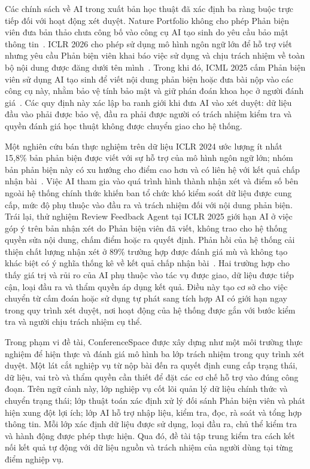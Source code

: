 Các chính sách về AI trong xuất bản học thuật đã xác định ba ràng buộc trực tiếp đối với hoạt động xét duyệt. Nature Portfolio không cho phép Phản biện viên đưa bản thảo chưa công bố vào công cụ AI tạo sinh do yêu cầu bảo mật thông tin~\cite{ch2ref41}. ICLR 2026 cho phép sử dụng mô hình ngôn ngữ lớn để hỗ trợ viết nhưng yêu cầu Phản biện viên khai báo việc sử dụng và chịu trách nhiệm về toàn bộ nội dung được đăng dưới tên mình~\cite{ch2ref15}. Trong khi đó, ICML 2025 cấm Phản biện viên sử dụng AI tạo sinh để viết nội dung phản biện hoặc đưa bài nộp vào các công cụ này, nhằm bảo vệ tính bảo mật và giữ phán đoán khoa học ở người đánh giá~\cite{ch2ref16}. Các quy định này xác lập ba ranh giới khi đưa AI vào xét duyệt: dữ liệu đầu vào phải được bảo vệ, đầu ra phải được người có trách nhiệm kiểm tra và quyền đánh giá học thuật không được chuyển giao cho hệ thống.

Một nghiên cứu bán thực nghiệm trên dữ liệu ICLR 2024 ước lượng ít nhất 15,8\% bản phản biện được viết với sự hỗ trợ của mô hình ngôn ngữ lớn; nhóm bản phản biện này có xu hướng cho điểm cao hơn và có liên hệ với kết quả chấp nhận bài~\cite{ch1ref14}. Việc AI tham gia vào quá trình hình thành nhận xét và điểm số bên ngoài hệ thống chính thức khiến ban tổ chức khó kiểm soát dữ liệu được cung cấp, mức độ phụ thuộc vào đầu ra và trách nhiệm đối với nội dung phản biện. Trái lại, thử nghiệm Review Feedback Agent tại ICLR 2025 giới hạn AI ở việc góp ý trên bản nhận xét do Phản biện viên đã viết, không trao cho hệ thống quyền sửa nội dung, chấm điểm hoặc ra quyết định. Phản hồi của hệ thống cải thiện chất lượng nhận xét ở 89\% trường hợp được đánh giá mù và không tạo khác biệt có ý nghĩa thống kê về kết quả chấp nhận bài~\cite{ch1ref3}. Hai trường hợp cho thấy giá trị và rủi ro của AI phụ thuộc vào tác vụ được giao, dữ liệu được tiếp cận, loại đầu ra và thẩm quyền áp dụng kết quả. Điều này tạo cơ sở cho việc chuyển từ cấm đoán hoặc sử dụng tự phát sang tích hợp AI có giới hạn ngay trong quy trình xét duyệt, nơi hoạt động của hệ thống được gắn với bước kiểm tra và người chịu trách nhiệm cụ thể.

Trong phạm vi đề tài, ConferenceSpace được xây dựng như một môi trường thực nghiệm để hiện thực và đánh giá mô hình ba lớp trách nhiệm trong quy trình xét duyệt. Một lát cắt nghiệp vụ từ nộp bài đến ra quyết định cung cấp trạng thái, dữ liệu, vai trò và thẩm quyền cần thiết để đặt các cơ chế hỗ trợ vào đúng công đoạn. Trên ngữ cảnh này, lớp nghiệp vụ cốt lõi quản lý dữ liệu chính thức và chuyển trạng thái; lớp thuật toán xác định xử lý đối sánh Phản biện viên và phát hiện xung đột lợi ích; lớp AI hỗ trợ nhập liệu, kiểm tra, đọc, rà soát và tổng hợp thông tin. Mỗi lớp xác định dữ liệu được sử dụng, loại đầu ra, chủ thể kiểm tra và hành động được phép thực hiện. Qua đó, đề tài tập trung kiểm tra cách kết nối kết quả tự động với dữ liệu nguồn và trách nhiệm của người dùng tại từng điểm nghiệp vụ.

